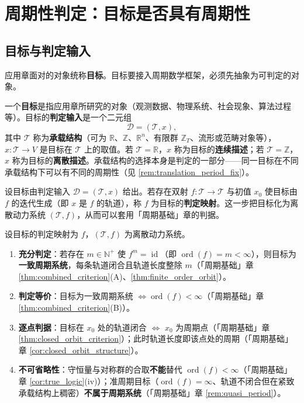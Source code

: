 \section{周期性判定：目标是否具有周期性}\label{sec:ps_periodicity_decision}

\subsection{目标与判定输入}

应用章面对的对象统称\textbf{目标}。目标要接入周期数学框架，必须先抽象为可判定的对象。

\begin{definition}[目标与判定输入]\label{def:ps_target}
一个\textbf{目标}是指应用章所研究的对象（观测数据、物理系统、社会现象、算法过程等）。目标的\textbf{判定输入}是一个二元组
\[
\mathcal{D}=(\mathcal{T},x),
\]
其中 $\mathcal{T}$ 称为\textbf{承载结构}（可为 $\mathbb{R}$、$\mathbb{Z}$、$\mathbb{R}^n$、有限群 $\mathbb{Z}_T$、流形或范畴对象等），$x:\mathcal{T}\to V$ 是目标在 $\mathcal{T}$ 上的取值。若 $\mathcal{T}=\mathbb{R}$，$x$ 称为目标的\textbf{连续描述}；若 $\mathcal{T}=\mathbb{Z}$，$x$ 称为目标的\textbf{离散描述}。承载结构的选择本身是判定的一部分——同一目标在不同承载结构下可以有不同的周期性（见 \cref{rem:translation_period_fix}）。
\end{definition}

\begin{definition}[判定映射]\label{def:ps_periodization}
设目标由判定输入 $\mathcal{D}=(\mathcal{T},x)$ 给出。若存在双射 $f:\mathcal{T}\to\mathcal{T}$ 与初值 $x_0$ 使目标由 $f$ 的迭代生成（即 $x$ 是 $f$ 的轨道），称 $f$ 为目标的\textbf{判定映射}。这一步把目标化为离散动力系统 $(\mathcal{T},f)$，从而可以套用「周期基础」章的判据。
\end{definition}

\begin{theorem}[周期性判定定理]\label{thm:ps_periodicity_decision}
设目标的判定映射为 $f$，$(\mathcal{T},f)$ 为离散动力系统。
\begin{enumerate}[label=(\Alph*)]
    \item \textbf{充分判定}：若存在 $m\in\mathbb{N}^+$ 使 $f^m=\operatorname{id}$（即 $\operatorname{ord}(f)=m<\infty$），则目标为\textbf{一致周期系统}，每条轨道闭合且轨道长度整除 $m$（「周期基础」章 \cref{thm:combined_criterion}(A)、\cref{thm:finite_order_orbit}）。
    \item \textbf{判定等价}：目标为一致周期系统 $\iff \operatorname{ord}(f)<\infty$（「周期基础」章 \cref{thm:combined_criterion}(B)）。
    \item \textbf{逐点判据}：目标在 $x_0$ 处的轨道闭合 $\iff$ $x_0$ 为周期点（「周期基础」章 \cref{thm:closed_orbit_criterion}）；此时轨道长度即该点处的周期（「周期基础」章 \cref{cor:closed_orbit_structure}）。
    \item \textbf{不可省略性}：守恒量与对称群的合取\textbf{不能}替代 $\operatorname{ord}(f)<\infty$（「周期基础」章 \cref{cor:true_logic}(iv)）；准周期目标（$\operatorname{ord}(f)=\infty$、轨道不闭合但在紧致承载结构上稠密）\textbf{不属于周期系统}（「周期基础」章 \cref{rem:quasi_period}）。
\end{enumerate}
\end{theorem}

